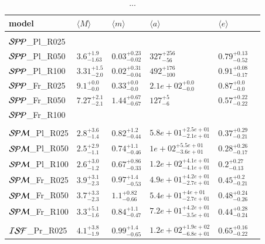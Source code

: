 \documentclass[aa]{lib/aa}
\begin{document}
\begin{table}
 \caption{...}
 \label{Tab:model_PP}
 \centering 
 \begin{tabular}{llllll}
 \hline\hline
model & $\langle M \rangle$ & $\langle m \rangle$ & $\langle a \rangle$ & $\langle e \rangle$ \\
        \hline \vspace{-0.75em}\\
${\cal SPP}$\_Pl\_R025 & \\%
${\cal SPP}$\_Pl\_R050 & $3.6^{+1.9}_{-1.63}$ & $0.03^{+0.23}_{-0.02}$ & $327^{+256}_{-56}$  & $0.79^{+0.13}_{-0.52}$ \\
${\cal SPP}$\_Pl\_R100 & $3.31^{+1.5}_{-2.0}$ & $0.02^{+0.31}_{-0.04}$ & $492^{+176}_{-100}$ & $0.91^{+0.08}_{-0.17}$ \\
${\cal SPP}$\_Fr\_R025 &$9.1^{+0.0}_{-0.0}$ & $0.33^{+0.0}_{-0.0}$ & $2.1e+02^{+0.0}_{-0.0}$ & $0.87^{+0.0}_{-0.0}$ \\
${\cal SPP}$\_Fr\_R050 & $7.27^{+2.1}_{-2.1}$ & $1.44^{+0.67}_{-0.67}$ & $127^{+5}_{-6}$    & $0.57^{+0.22}_{-0.22}$ \\
${\cal SPP}$\_Fr\_R100 & \\
  \hline \vspace{-0.75em} \\ 
${\cal SPM}$\_Pl\_R025 & $2.8^{+3.6}_{-1.4}$ & $0.82^{+1.2}_{-0.44}$ & $5.8e+01^{+2.5e+01}_{-2.1e+01}$ & $0.37^{+0.29}_{-0.21}$ \\ 
${\cal SPM}$\_Pl\_R050 & $2.5^{+2.9}_{-1.1}$ & $0.74^{+1.1}_{-0.46}$ & $1e+02^{+5.5e+01}_{-3.6e+01}$ & $0.28^{+0.26}_{-0.17}$ \\
${\cal SPM}$\_Pl\_R100 & $2.6^{+3.0}_{-1.2}$ & $0.67^{+0.86}_{-0.33}$ & $1.2e+02^{+4.1e+01}_{-4.1e+01}$ & $0.2^{+0.27}_{-0.13}$ \\
${\cal SPM}$\_Fr\_R025 & $3.9^{+3.1}_{-2.3}$ & $0.97^{+1.4}_{-0.53}$ & $4.9e+01^{+4.2e+01}_{-2.7e+01}$ & $0.45^{+0.2}_{-0.21}$ \\
${\cal SPM}$\_Fr\_R050 & $3.7^{+3.3}_{-2.3}$ & $1.1^{+0.82}_{-0.66}$ & $5.4e+01^{+4e+01}_{-2.7e+01}$ & $0.48^{+0.24}_{-0.26}$ \\
${\cal SPM}$\_Fr\_R100 & $3.3^{+5.1}_{-1.6}$ & $0.84^{+1.1}_{-0.47}$ & $7.2e+01^{+4.2e+01}_{-3.5e+01}$ & $0.44^{+0.28}_{-0.24}$ \\
  \hline \vspace{-0.75em} \\ 
${\cal ISF}$\_Pr\_R025 & $4.1^{+3.8}_{-1.9}$ & $0.99^{+1.4}_{-0.65}$ & $1.2e+02^{+1.9e+02}_{-6.8e+01}$ & $0.65^{+0.16}_{-0.22}$ \\

\end{tabular}
\end{table}
\end{document}
